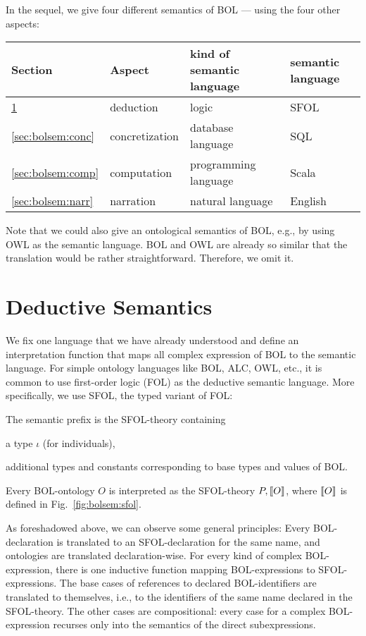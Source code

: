 In the sequel, we give four different semantics of BOL --- using the four other aspects:
\begin{center}
\begin{tabular}{llll}
Section & Aspect & kind of semantic language & semantic language\\
\hline
\ref{sec:bolsem:ded} & deduction & logic & SFOL \\
\ref{sec:bolsem:conc} & concretization & database language & SQL \\
\ref{sec:bolsem:comp} & computation & programming language & Scala \\
\ref{sec:bolsem:narr} & narration & natural language & English \\
\end{tabular}
\end{center}

Note that we could also give an ontological semantics of BOL, e.g., by using OWL as the semantic language.
BOL and OWL are already so similar that the translation would be rather straightforward.
Therefore, we omit it.

\section{Deductive Semantics}\label{sec:bolsem:ded}

We fix one language that we have already understood and define an interpretation function that maps all complex expression of BOL to the semantic language.
For simple ontology languages like BOL, ALC, OWL, etc., it is common to use first-order logic (FOL) as the deductive semantic language.
More specifically, we use SFOL, the typed variant of FOL:

\begin{definition}\label{def:bolsem:sfol}
The semantic prefix is the SFOL-theory containing
\begin{compactitem}
 \item a type $\iota$ (for individuals),
 \item additional types and constants corresponding to base types and values of BOL.
\end{compactitem}

Every BOL-ontology $O$ is interpreted as the SFOL-theory $P,\llbracket O\rrbracket$, where $\llbracket O\rrbracket$ is defined in Fig.~\ref{fig:bolsem:sfol}.
\end{definition}

As foreshadowed above, we can observe some general principles:
Every BOL-declaration is translated to an SFOL-declaration for the same name, and ontologies are translated declaration-wise.
For every kind of complex BOL-expression, there is one inductive function mapping BOL-expressions to SFOL-expressions.
The base cases of references to declared BOL-identifiers are translated to themselves, i.e., to the identifiers of the same name declared in the SFOL-theory.
The other cases are compositional: every case for a complex BOL-expression recurses only into the semantics of the direct subexpressions.

